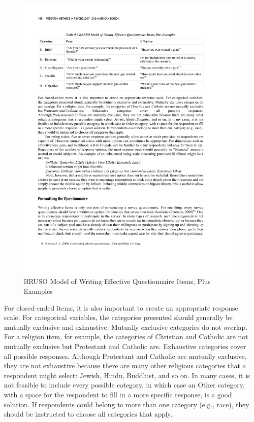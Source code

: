 \begin{figure}



\includegraphics[width=\linewidth]{figures/C9bruso.pdf}



\caption{BRUSO Model of Writing Effective Questionnaire Items, Plus Examples}



\label{fig:bruso}



\end{figure}

For closed-ended items, it is also important to create an appropriate response scale. For categorical variables, the categories presented should generally be mutually exclusive and exhaustive. Mutually exclusive categories do not overlap. For a religion item, for example, the categories of Christian and Catholic are not mutually exclusive but Protestant and Catholic are. Exhaustive categories cover all possible responses. Although Protestant and Catholic are mutually exclusive, they are not exhaustive because there are many other religious categories that a respondent might select: Jewish, Hindu, Buddhist, and so on. In many cases, it is not feasible to include every possible category, in which case an Other category, with a space for the respondent to fill in a more specific response, is a good solution. If respondents could belong to more than one category (e.g., race), they should be instructed to choose all categories that apply.


